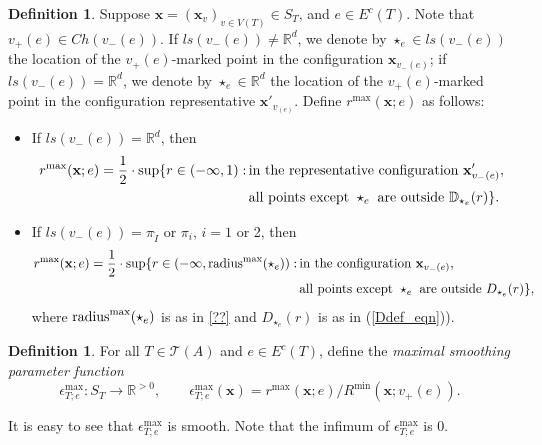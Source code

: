 \documentclass[11pt]{article}
\theoremstyle{definition}
\newtheorem{dfn}[thm]{Definition}
\theoremstyle{remark}
\def\R{\mathbb{R}}
\def\D{\mathbb{D}}
\def\cT{\mathcal{T}}
\def\rI{{\mathring{I}}}
\def\Ch{{{Ch}}}
\def\bx{\mathbf{x}}
\def\tn#1{\textnormal{#1}}
\begin{document}
\begin{dfn}\label{rmax_dfn}
Suppose $\bx=(\bx_v)_{v\in V(T)}\in S_T$, and $e\in E^c(T)$. Note that $v_+(e)\in \Ch(v_-(e))$. If $ls(v_-(e))\neq\R^d$, we denote by $\star_e\in ls(v_-(e))$ the location of the $v_+(e)$-marked point in the configuration $\bx_{v_-(e)}$; if $ls(v_-(e))=\R^d$, we denote by $\star_e\in\R^d$ the location of the $v_+(e)$-marked point in the configuration representative $\bx'_{v_(e)}$. 
Define $r^{\max}(\bx;e)$ as follows:
\begin{itemize}
\item 
If $ls(v_-(e))=\R^d$, then 
\begin{align*}
r^{\max}(\bx;e)=\frac{1}{2}\cdot\sup\{r\in(-\infty,1):\, &\tn{in the representative configuration }\bx'_{v_-(e)},\\
&\tn{all points
except }\star_e \tn{ are outside }\D_{\star_e}(r)\}.
\end{align*}
\item
If $ls(v_-(e))=\pi_\rI$ or $\pi_i$, $i=1$ or 2, 
then 
\begin{align*}
r^{\max}(\bx;e)=\frac{1}{2}\cdot\sup\{r\in(-\infty, \tn{radius}^{\max}(\star_e)) :\, &\tn{in the configuration }\bx_{v_-(e)},\\
&\tn{all points
except }\star_e \tn{ are outside }D_{\star_e}(r)\},
\end{align*}
where $\tn{radius}^{\max}(\star_e)$ is as in \ref{??} and $D_{\star_e}(r)$ is as in (\ref{Ddef_eqn})).
\end{itemize}
\end{dfn}

\begin{dfn}
For all $T\in\cT(A)$ and $e\in E^c(T)$, define the {\it maximal smoothing parameter function}
$$\epsilon^{\max}_{T;e}:S_T\longrightarrow \R^{>0},\qquad \epsilon^{\max}_{T;e}(\bx)=r^{\max}(\bx;e)\big/R^{\min}(\bx;v_+(e)).$$
\end{dfn}
It is easy to see that $\epsilon^{\max}_{T;e}$ is smooth. Note that the infimum of $\epsilon^{\max}_{T;e}$
 is 0. 

\end{document}
